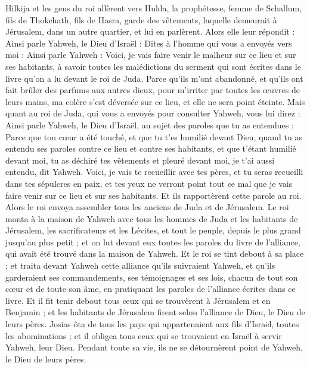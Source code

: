 \begin{multicols}{2}
Hilkija et les gens du roi allèrent vers Hulda, la prophétesse, femme de Schallum, fils de Thokehath, fils de Hasra, garde des vêtements, laquelle demeurait à Jérusalem, dans un autre quartier, et lui en parlèrent.
Alors elle leur répondit : Ainsi parle Yahweh, le Dieu d'Israël : Dites à l'homme qui vous a envoyés vers moi :
Ainsi parle Yahweh : Voici, je vais faire venir le malheur sur ce lieu et sur ses habitants, à savoir toutes les malédictions du serment qui sont écrites dans le livre qu'on a lu devant le roi de Juda.
Parce qu'ils m'ont abandonné, et qu'ils ont fait brûler des parfums aux autres dieux, pour m'irriter par toutes les œuvres de leurs mains, ma colère s'est déversée sur ce lieu, et elle ne sera point éteinte.
Mais quant au roi de Juda, qui vous a envoyés pour consulter Yahweh, vous lui direz : Ainsi parle Yahweh, le Dieu d'Israël, au sujet des paroles que tu as entendues :
Parce que ton cœur a été touché, et que tu t'es humilié devant Dieu, quand tu as entendu ses paroles contre ce lieu et contre ses habitants, et que t'étant humilié devant moi, tu as déchiré tes vêtements et pleuré devant moi, je t'ai aussi entendu, dit Yahweh.
Voici, je vais te recueillir avec tes pères, et tu seras recueilli dans tes sépulcres en paix, et tes yeux ne verront point tout ce mal que je vais faire venir sur ce lieu et sur ses habitants. Et ils rapportèrent cette parole au roi.
Alors le roi envoya assembler tous les anciens de Juda et de Jérusalem.
Le roi monta à la maison de Yahweh avec tous les hommes de Juda et les habitants de Jérusalem, les sacrificateurs et les Lévites, et tout le peuple, depuis le plus grand jusqu'au plus petit ; et on lut devant eux toutes les paroles du livre de l'alliance, qui avait été trouvé dans la maison de Yahweh.
Et le roi se tint debout à sa place ; et traita devant Yahweh cette alliance qu'ils suivraient Yahweh, et qu'ils garderaient ses commandements, ses témoignages et ses lois, chacun de tout son cœur et de toute son âme, en pratiquant les paroles de l'alliance écrites dans ce livre.
Et il fit tenir debout tous ceux qui se trouvèrent à Jérusalem et en Benjamin ; et les habitants de Jérusalem firent selon l'alliance de Dieu, le Dieu de leurs pères.
Josias ôta de tous les pays qui appartenaient aux fils d'Israël, toutes les abominations ; et il obligea tous ceux qui se trouvaient en Israël à servir Yahweh, leur Dieu. Pendant toute sa vie, ils ne se détournèrent point de Yahweh, le Dieu de leurs pères.

\end{multicols}
